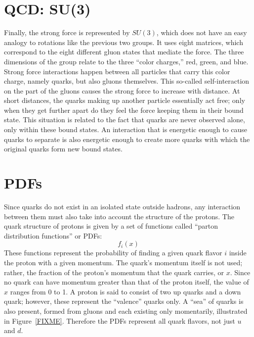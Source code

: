 \section{QCD: SU(3)}
Finally, the strong force is represented by $SU(3)$, 
which does not have an easy analogy to rotations 
like the previous two groups.  
It uses eight matrices, which correspond to the 
eight different gluon states that mediate the force.  
The three dimensions of the group relate to the 
three ``color charges,'' red, green, and blue.  
Strong force interactions happen between all particles 
that carry this color charge, 
namely quarks, but also gluons themselves.  
This so-called self-interaction on the part of the gluons 
causes the strong force to increase with distance.  
At short distances, the quarks making up another particle 
essentially act free; 
only when they get further apart do they feel the force 
keeping them in their bound state.  
This situation is related to the fact that quarks are 
never observed alone, only within these bound states.  
An interaction that is energetic enough to cause 
quarks to separate is also energetic enough to 
create more quarks with which the original quarks 
form new bound states.  


\section{PDFs}

Since quarks do not exist in an isolated state 
outside hadrons, 
any interaction between them must also take 
into account the structure of the protons.  
The quark structure of protons is given 
by a set of functions called 
``parton distribution functions'' or PDFs: 
\[
f_i(x)
\]
These functions represent the probability 
of finding a given quark flavor $i$ inside 
the proton with a given momentum.  
The quark's momentum itself is not used; 
rather, the fraction of the proton's 
momentum that the quark carries, or $x$. 
Since no quark can have momentum greater 
than that of the proton itself, 
the value of $x$ ranges from 0 to 1.  
A proton is said to consist of two up quarks 
and a down quark; 
however, these represent the ``valence'' quarks only.  
A ``sea'' of quarks is also present, 
formed from gluons and each existing only 
momentarily, 
illustrated in Figure~\ref{FIXME}.  
Therefore the PDFs represent all quark 
flavors, not just $u$ and $d$.  


